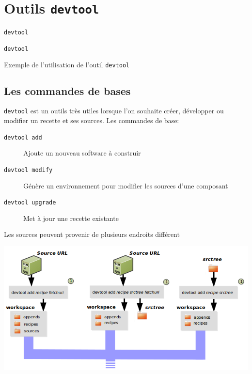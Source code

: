 \documentclass[compress]{smilebeamer}
\begin{document}
\section{Outils \texttt{devtool}}

\begin{frame}{\texttt{devtool}}
\end{frame}

\begin{frame}{\texttt{devtool}}
\begin{center}
\huge{Exemple de l'utilisation de l'outil \texttt{devtool}}
\end{center}
\end{frame}

\subsection{Les commandes de bases}

\begin{frame}
\texttt{devtool} est un outils très utiles lorsque l'on souhaite créer, développer ou modifier un recette et ses sources.\newline
Les commandes de base:
\begin{description}
	\item[\texttt{devtool add}] Ajoute un nouveau software à construir
	\item[\texttt{devtool modify}] Génère un environnement pour modifier les sources d'une composant
	\item[\texttt{devtool upgrade}] Met à jour une recette existante
\end{description}
\end{frame}

\begin{frame}
Les sources peuvent provenir de plusieurs endroits différent
\begin{center}
	\includegraphics[width=1\textwidth]{images/devtool-add-src.png}
\end{center}
\end{frame}
\end{document}
